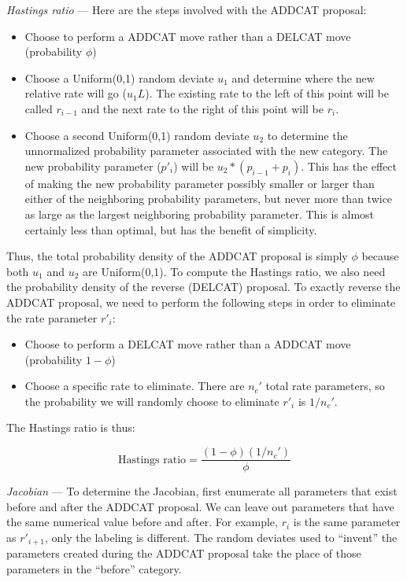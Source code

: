 \documentclass[12pt]{article}
\newcommand{\ncat}{n_c}
\begin{document}
{\em Hastings ratio} --- Here are the steps involved with the ADDCAT proposal:
\begin{itemize}
\item Choose to perform a ADDCAT move rather than a DELCAT move (probability $\phi$)
\item Choose a Uniform(0,1) random deviate $u_1$ and determine where the new relative rate will go ($u_1 L$). The existing rate to the left of this point will be called $r_{i-1}$ and the next rate to the right of this point will be $r_i$.
\item Choose a second Uniform(0,1) random deviate $u_2$ to determine the unnormalized probability parameter associated with the new category. The new probability parameter ($p'_i$) will be $u_2*(p_{i-1} + p_i)$. This has the effect of making the new probability parameter possibly smaller or larger than either of the neighboring probability parameters, but never more than twice as large as the largest neighboring probability parameter. This is almost certainly less than optimal, but has the benefit of simplicity. 
\end{itemize}

Thus, the total probability density of the ADDCAT proposal is simply $\phi$ because both $u_1$ and $u_2$ are Uniform(0,1). To compute the Hastings ratio, we also need the probability density of the reverse (DELCAT) proposal. To exactly reverse the ADDCAT proposal, we need to perform the following steps in order to eliminate the rate parameter $r'_i$:

\begin{itemize}
\item Choose to perform a DELCAT move rather than a ADDCAT move (probability $1-\phi$)
\item Choose a specific rate to eliminate. There are $\ncat'$ total rate parameters, so the probability we will randomly choose to eliminate $r'_i$ is $1/\ncat'$.
\end{itemize}

The Hastings ratio is thus:

\[ \mbox{Hastings ratio} = \frac{(1-\phi)(1/\ncat')}{\phi} \]

{\em Jacobian} --- To determine the Jacobian, first enumerate all parameters that exist before and after the ADDCAT proposal. We can leave out parameters that have the same numerical value before and after. For example, $r_{i}$ is the same parameter as $r'_{i+1}$, only the labeling is different. The random deviates used to ``invent'' the parameters created during the ADDCAT proposal take the place of those parameters in the ``before'' category.
\end{document}
